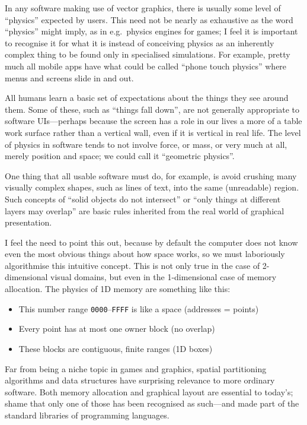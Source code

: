 In any software making use of vector graphics, there is usually some
level of ``physics'' expected by users. This need not be nearly as
exhaustive as the word ``physics'' might imply, as in e.g.~physics
engines for games; I feel it is important to recognise it for what it is
instead of conceiving physics as an inherently complex thing to be found
only in specialised simulations. For example, pretty much all mobile
apps have what could be called ``phone touch physics'' where menus and
screens slide in and out.

All humans learn a basic set of expectations about the things they see
around them. Some of these, such as ``things fall down'', are not
generally appropriate to software UIs---perhaps because the screen has a
role in our lives a more of a table work surface rather than a vertical
wall, even if it is vertical in real life. The level of physics in
software tends to not involve force, or mass, or very much at all,
merely position and space; we could call it ``geometric physics''.

One thing that all usable software must do, for example, is avoid
crushing many visually complex shapes, such as lines of text, into the
same (unreadable) region. Such concepts of ``solid objects do not
intersect'' or ``only things at different layers may overlap'' are basic
rules inherited from the real world of graphical presentation.

I feel the need to point this out, because by default the computer does
not know even the most obvious things about how space works, so we must
laboriously algorithmise this intuitive concept. This is not only true
in the case of 2-dimensional visual domains, but even in the
1-dimensional case of memory allocation. The physics of 1D memory are
something like this:

\begin{itemize}
\tightlist
\item
  This number range \texttt{0000}--\texttt{FFFF} is like a space
  (addresses = points)
\item
  Every point has at most one owner block (no overlap)
\item
  These blocks are contiguous, finite ranges (1D boxes)
\end{itemize}

Far from being a niche topic in games and graphics, spatial partitioning
algorithms and data structures have surprising relevance to more
ordinary software. Both memory allocation and graphical layout are
essential to today's; shame that only one of those has been recognised
as such---and made part of the standard libraries of programming
languages.

